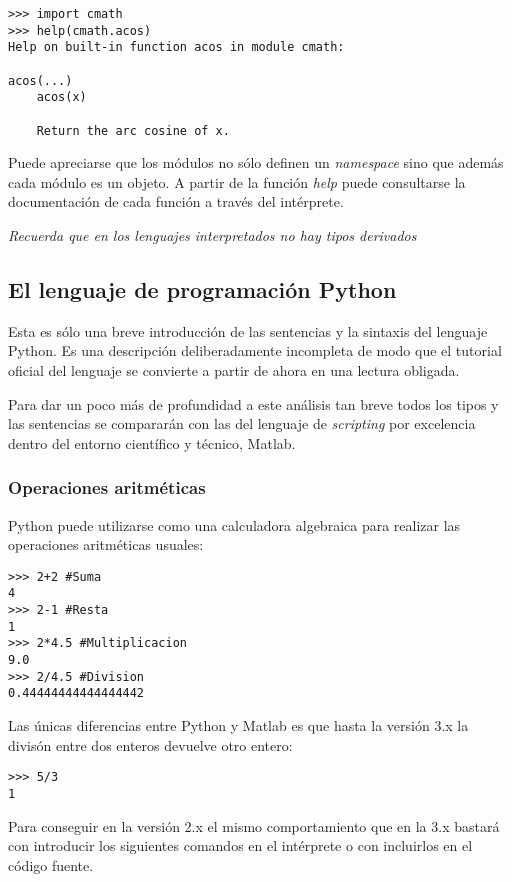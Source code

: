 \documentclass[a4paper,10pt]{article}
\begin{document}
\begin{lstlisting}
>>> import cmath
>>> help(cmath.acos)
Help on built-in function acos in module cmath:

acos(...)
    acos(x)

    Return the arc cosine of x.
\end{lstlisting}

Puede apreciarse que los módulos no sólo definen un \emph{namespace}
sino que además cada módulo es un objeto.  A partir de la función
\emph{help} puede consultarse la documentación de cada función a
través del intérprete.

\emph{Recuerda que en los lenguajes interpretados no hay tipos derivados}
\subsection{El lenguaje de programación Python}

Esta es sólo una breve introducción de las sentencias y la sintaxis
del lenguaje Python.  Es una descripción deliberadamente incompleta de
modo que el tutorial oficial del lenguaje\cite{TUT} se convierte a
partir de ahora en una lectura obligada.

Para dar un poco más de profundidad a este análisis tan breve todos
los tipos y las sentencias se compararán con las del lenguaje de
\emph{scripting} por excelencia dentro del entorno científico y
técnico, Matlab.

\subsubsection{Operaciones aritméticas}

Python puede utilizarse como una calculadora algebraica para realizar
las operaciones aritméticas usuales:

\begin{lstlisting}
>>> 2+2 #Suma
4
>>> 2-1 #Resta
1
>>> 2*4.5 #Multiplicacion
9.0
>>> 2/4.5 #Division
0.44444444444444442
\end{lstlisting}

Las únicas diferencias entre Python y Matlab es que hasta la versión 3.x
la divisón entre dos enteros devuelve otro entero:

\begin{lstlisting}
>>> 5/3
1
\end{lstlisting}

Para conseguir en la versión 2.x el mismo comportamiento que en la 3.x
bastará con introducir los siguientes comandos en el intérprete o con
incluirlos en el código fuente.
\end{document}
